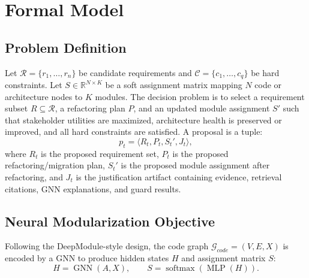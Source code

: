 \documentclass[english,preprint,nonatbib]{elsarticle}
\newcommand{\Rset}{\mathcal{R}}
\newcommand{\Cset}{\mathcal{C}}
\newcommand{\Gcode}{\mathcal{G}_{code}}
\begin{document}
\section{Formal Model}
\label{sec:formal}

\subsection{Problem Definition}

Let $\Rset = \{r_1,\ldots,r_n\}$ be candidate requirements and $\Cset = \{c_1,\ldots,c_q\}$ be hard constraints.
Let $S \in \mathbb{R}^{N\times K}$ be a soft assignment matrix mapping $N$ code or architecture nodes to $K$ modules.
The decision problem is to select a requirement subset $R \subseteq \Rset$, a refactoring plan $P$, and an updated module assignment $S'$ such that stakeholder utilities are maximized, architecture health is preserved or improved, and all hard constraints are satisfied.
A proposal is a tuple:
\begin{equation}
    p_t = \langle R_t, P_t, S_t', J_t \rangle,
\end{equation}
where $R_t$ is the proposed requirement set, $P_t$ is the proposed refactoring/migration plan, $S_t'$ is the proposed module assignment after refactoring, and $J_t$ is the justification artifact containing evidence, retrieval citations, GNN explanations, and guard results.

\subsection{Neural Modularization Objective}

Following the DeepModule-style design, the code graph $\Gcode=(V,E,X)$ is encoded by a GNN to produce hidden states $H$ and assignment matrix $S$:
\begin{equation}
H = \operatorname{GNN}(A, X), \qquad
S = \operatorname{softmax}(\operatorname{MLP}(H)).
\end{equation}
\end{document}
